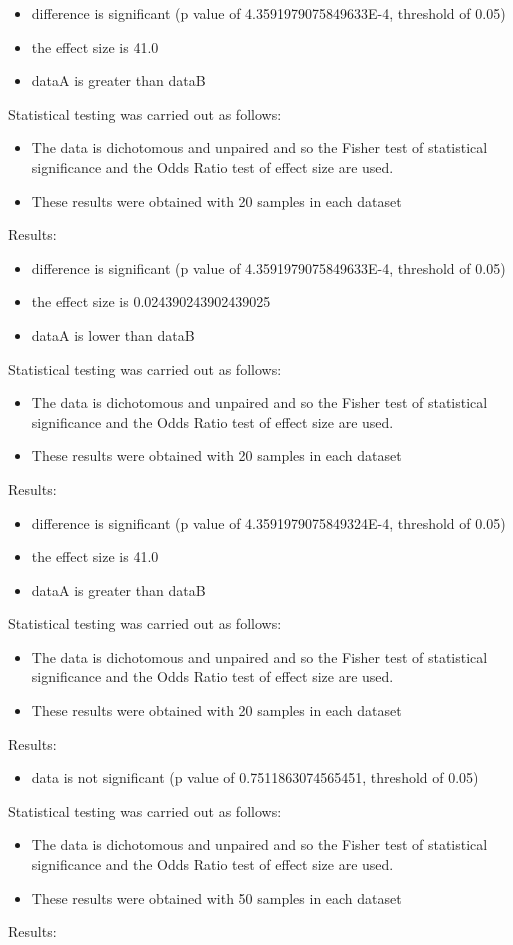 \documentclass[]{article}
\begin{document}
\begin{itemize}
\item{difference is significant (p value of 4.3591979075849633E-4, threshold of 0.05)}
\item{the effect size is 41.0}
\item{dataA is greater than dataB}
\end{itemize}Statistical testing was carried out as follows: \begin{itemize}
\item{The data is dichotomous and unpaired and so the Fisher test of statistical significance and the Odds Ratio test of effect size are used.}
\item{These results were obtained with 20 samples in each dataset}
\end{itemize}Results:
\begin{itemize}
\item{difference is significant (p value of 4.3591979075849633E-4, threshold of 0.05)}
\item{the effect size is 0.024390243902439025}
\item{dataA is lower than dataB}
\end{itemize}Statistical testing was carried out as follows: \begin{itemize}
\item{The data is dichotomous and unpaired and so the Fisher test of statistical significance and the Odds Ratio test of effect size are used.}
\item{These results were obtained with 20 samples in each dataset}
\end{itemize}Results:
\begin{itemize}
\item{difference is significant (p value of 4.3591979075849324E-4, threshold of 0.05)}
\item{the effect size is 41.0}
\item{dataA is greater than dataB}
\end{itemize}Statistical testing was carried out as follows: \begin{itemize}
\item{The data is dichotomous and unpaired and so the Fisher test of statistical significance and the Odds Ratio test of effect size are used.}
\item{These results were obtained with 20 samples in each dataset}
\end{itemize}Results:
\begin{itemize}
\item{data is not significant (p value of 0.7511863074565451, threshold of 0.05)}
\end{itemize}Statistical testing was carried out as follows: \begin{itemize}
\item{The data is dichotomous and unpaired and so the Fisher test of statistical significance and the Odds Ratio test of effect size are used.}
\item{These results were obtained with 50 samples in each dataset}
\end{itemize}Results:
\end{document}
